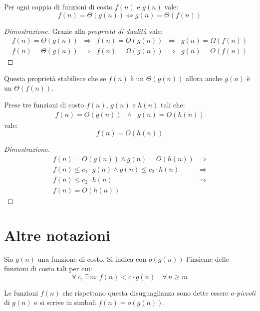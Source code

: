 \begin{definition}
    Per ogni coppia di funzioni di costo $f(n)$ e $g(n)$ vale:
    \[f(n)=\Theta(g(n))\Leftrightarrow g(n)=\Theta(f(n))\]
\end{definition}
\begin{proof}[Dimostrazione]
    Grazie alla \emph{proprietà di dualità} vale:
    \[\begin{array}{rcccl}
        f(n)=\Theta(g(n)) & \Rightarrow & f(n)=O(g(n)) & \Rightarrow & g(n)=\Omega(f(n))\\
        f(n)=\Theta(g(n)) & \Rightarrow & f(n)=\Omega(g(n)) & \Rightarrow & g(n)=O(f(n))
    \end{array}\]
\end{proof}\noindent
Questa proprietà stabilisce che se $f(n)$ è un $\Theta(g(n))$ allora anche $g(n)$
è un $\Theta(f(n))$.

\begin{definition}
    Prese tre funzioni di costo $f(n)$, $g(n)$ e $h(n)$ tali che:
    \[\begin{array}{lcr}
        f(n)=O(g(n)) & \wedge & g(n)=O(h(n))
    \end{array}\]
    vale:
    \[f(n)=O(h(n))\]
\end{definition}
\begin{proof}[Dimostrazione]
    \[\begin{array}{rc}
        f(n)=O(g(n))\wedge g(n)=O(h(n)) & \Rightarrow\\
        f(n)\leq c_1\cdot g(n)\wedge g(n)\leq c_2\cdot h(n) & \Rightarrow\\
        f(n)\leq c_2\cdot h(n) & \Rightarrow\\
        f(n)=O(h(n))
    \end{array}\]
\end{proof}

\section{Altre notazioni}
\begin{definition}[Notazione $o$]
    Sia $g(n)$ una funzione di costo. Si indica con $o(g(n))$ l'insieme delle
    funzioni di costo tali per cui:
    \[\forall\,c,\,\exists\,m:f(n)<c\cdot g(n)\quad\forall\,n\geq m\]
\end{definition}\noindent
Le funzioni $f(n)$ che rispettano questa disuguaglianza sono dette essere
\emph{$o$-piccoli} di $g(n)$ e si scrive in simboli $f(n)=o(g(n))$.

